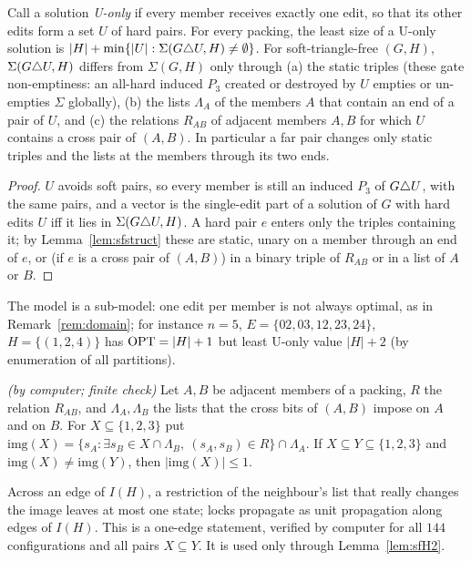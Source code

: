 \begin{lemma}\label{lem:sfU}
Call a solution \emph{U-only} if every member receives exactly one edit, so that its other edits form a set $U$ of hard pairs. For every packing, the least size of a U-only solution is $|H|+\min\{|U|:\Sigma(G\triangle U,H)\ne\emptyset\}$. For soft-triangle-free $(G,H)$, $\Sigma(G\triangle U,H)$ differs from $\Sigma(G,H)$ only through (a) the static triples (these gate non-emptiness: an all-hard induced $P_3$ created or destroyed by $U$ empties or un-empties $\Sigma$ globally), (b) the lists $\Lambda_A$ of the members $A$ that contain an end of a pair of $U$, and (c) the relations $R_{AB}$ of adjacent members $A,B$ for which $U$ contains a cross pair of $(A,B)$. In particular a far pair changes only static triples and the lists at the members through its two ends.
\end{lemma}
\begin{proof}
$U$ avoids soft pairs, so every member is still an induced $P_3$ of $G\triangle U$, with the same pairs, and a vector is the single-edit part of a solution of $G$ with hard edits $U$ iff it lies in $\Sigma(G\triangle U,H)$. A hard pair $e$ enters only the triples containing it; by Lemma~\ref{lem:sfstruct} these are static, unary on a member through an end of $e$, or (if $e$ is a cross pair of $(A,B)$) in a binary triple of $R_{AB}$ or in a list of $A$ or $B$.
\end{proof}
The model is a sub-model: one edit per member is not always optimal, as in Remark~\ref{rem:domain}; for instance $n=5$, $E=\{02,03,12,23,24\}$, $H=\{(1,2,4)\}$ has $\mathrm{OPT}=|H|+1$ but least U-only value $|H|+2$ (by enumeration of all partitions).

\begin{lemma}[Strictness]\label{lem:sfS}
\emph{(by computer; finite check)} Let $A,B$ be adjacent members of a packing, $R$ the relation $R_{AB}$, and $\Lambda_A,\Lambda_B$ the lists that the cross bits of $(A,B)$ impose on $A$ and on $B$. For $X\subseteq\{1,2,3\}$ put $\mathrm{img}(X)=\{s_A:\exists s_B\in X\cap\Lambda_B,\ (s_A,s_B)\in R\}\cap\Lambda_A$. If $X\subseteq Y\subseteq\{1,2,3\}$ and $\mathrm{img}(X)\ne\mathrm{img}(Y)$, then $|\mathrm{img}(X)|\le1$.
\end{lemma}
Across an edge of $I(H)$, a restriction of the neighbour's list that really changes the image leaves at most one state; locks propagate as unit propagation along edges of $I(H)$. This is a one-edge statement, verified by computer for all $144$ configurations and all pairs $X\subseteq Y$. It is used only through Lemma~\ref{lem:sfH2}.

